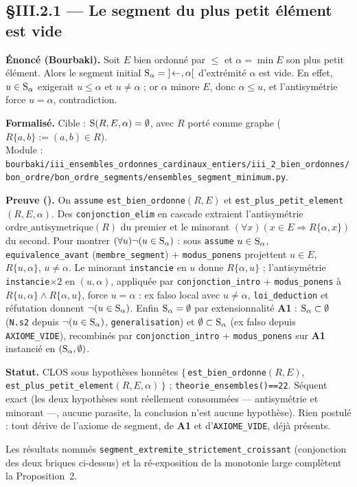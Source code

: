 \subsection{§III.2.1 --- Le segment du plus petit élément est vide}
\textbf{Énoncé (Bourbaki).} Soit $E$ bien ordonné par $\le$ et $\alpha = \min E$ son plus petit élément. Alors le segment initial $\mathrm{S}_\alpha = {]\!\leftarrow,\alpha[}$ d'extrémité $\alpha$ est vide. En effet, $u\in\mathrm{S}_\alpha$ exigerait $u\le\alpha$ et $u\neq\alpha$ ; or $\alpha$ minore $E$, donc $\alpha\le u$, et l'antisymétrie force $u=\alpha$, contradiction.

\textbf{Formalisé.} Cible : $\mathrm{S}(R,E,\alpha)=\emptyset$, avec $R$ porté comme graphe ($R\{a,b\} := (a,b)\in R$). \\
Module : \texttt{bourbaki/iii\_ensembles\_ordonnes\_cardinaux\_entiers/iii\_2\_bien\_ordonnes/bon\_ordre/bon\_ordre\_segments/ensembles\_segment\_minimum.py}.

\textbf{Preuve (\Nstar).} On \texttt{assume} \texttt{est\_bien\_ordonne}$(R,E)$ et \texttt{est\_plus\_petit\_element}$(R,E,\alpha)$. Des \texttt{conjonction\_elim} en cascade extraient l'antisymétrie $\mathrm{ordre\_antisymetrique}(R)$ du premier et le minorant $(\forall x)(x\in E\Rightarrow R\{\alpha,x\})$ du second. Pour montrer $(\forall u)\neg(u\in\mathrm{S}_\alpha)$ : sous \texttt{assume} $u\in\mathrm{S}_\alpha$, \texttt{equivalence\_avant} (\texttt{membre\_segment}) + \texttt{modus\_ponens} projettent $u\in E$, $R\{u,\alpha\}$, $u\neq\alpha$. Le minorant \texttt{instancie} en $u$ donne $R\{\alpha,u\}$ ; l'antisymétrie \texttt{instancie}$\times 2$ en $(u,\alpha)$, appliquée par \texttt{conjonction\_intro} + \texttt{modus\_ponens} à $R\{u,\alpha\}\wedge R\{\alpha,u\}$, force $u=\alpha$ : ex falso local avec $u\neq\alpha$, \texttt{loi\_deduction} et réfutation donnent $\neg(u\in\mathrm{S}_\alpha)$. Enfin $\mathrm{S}_\alpha=\emptyset$ par extensionnalité \textbf{A1} : $\mathrm{S}_\alpha\subset\emptyset$ (\texttt{N.s2} depuis $\neg(u\in\mathrm{S}_\alpha)$, \texttt{generalisation}) et $\emptyset\subset\mathrm{S}_\alpha$ (ex falso depuis \texttt{AXIOME\_VIDE}), recombinés par \texttt{conjonction\_intro} + \texttt{modus\_ponens} sur \textbf{A1} instancié en $(\mathrm{S}_\alpha,\emptyset)$.

\textbf{Statut.} CLOS sous hypothèses honnêtes $\{\,$\texttt{est\_bien\_ordonne}$(R,E)$, \texttt{est\_plus\_petit\_element}$(R,E,\alpha)\,\}$ ; \texttt{theorie\_ensembles()==22}. Séquent exact (les deux hypothèses sont réellement consommées --- antisymétrie et minorant ---, aucune parasite, la conclusion n'est aucune hypothèse). Rien postulé : tout dérive de l'axiome de segment, de \textbf{A1} et d'\texttt{AXIOME\_VIDE}, déjà présents.

Les résultats nommés \texttt{segment\_extremite\_strictement\_croissant} (conjonction des deux briques ci-dessus) et la ré-exposition de la monotonie large complètent la Proposition~2.
